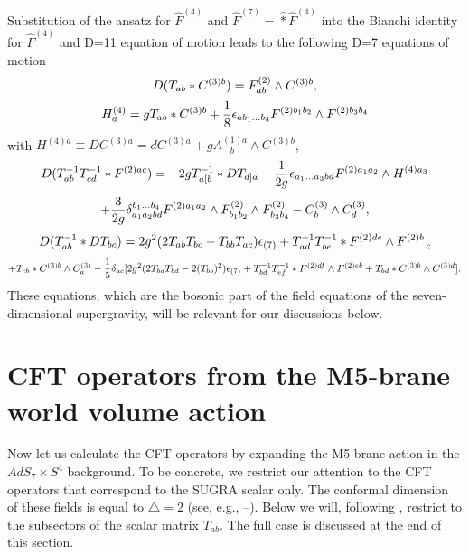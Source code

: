\documentclass[a4paper,11pt]{article}
\begin{document}
Substitution of the ansatz for ${\hat F}^{(4)}$ and ${\hat
F}^{(7)}=\hat{\ast}\hat F^{(4)}$ into the Bianchi identity for
${\hat F}^{(4)}$ and D=11 equation of motion  leads to the
following D=7 equations of motion
\begin{equation}\plabel{emC3}
D(T_{ab}\ast C^{(3)b})=F^{(2)}_{ab}\wedge C^{(3)b},
\end{equation}
\begin{equation}\plabel{emH4}
H^{(4)}_a=g T_{ab}\ast C^{(3)b}+{1\over 8}\e_{a b_1\dots b_4}F^{(2)b_1 b_2}\wedge
F^{(2)b_3 b_4}
\end{equation}
with $H^{(4)a}\equiv D C^{(3)a}=dC^{(3)a}+g A^{(1)a}_{~~~~b}\wedge C^{(3)b}$,
\begin{equation}\plabel{emF2}
D(T^{-1}_{ab}T^{-1}_{cd}\ast F^{(2)ac})=-2g T^{-1}_{a[b}\ast DT_{d]a}-{1\over 2g}
\e_{a_1\dots a_3 bd}F^{(2)a_1 a_2}\wedge H^{(4)a_3}
\end{equation}
$$
+{3\over 2g}\delta^{b_1\dots b_4}_{a_1 a_2 bd}F^{(2)a_1 a_2}\wedge
F^{(2)}_{b_1 b_2}\wedge F^{(2)}_{b_3 b_4}-C^{(3)}_b\wedge
C^{(3)}_{d},
$$
\begin{equation}\plabel{emT}
D(T^{-1}_{ab}\ast DT_{bc})=2g^2
(2T_{ab}T_{bc}-T_{bb}T_{ac})\e_{(7)} +T^{-1}_{ad}T^{-1}_{be}\ast
F^{(2)de}\wedge F^{(2)b}_{~~~~~c}
\end{equation}
$$
+T_{cb}\ast C^{(3)b}\wedge C^{(3)}_{a}-{1\over 5}\delta_{ac}[2g^2 (2T_{bd}T_{bd}-2(T_{bb})^2)
\epsilon_{(7)} +T^{-1}_{bd}T^{-1}_{ef}\ast F^{(2)df}\wedge F^{(2)eb}+T_{bd}\ast C^{(3)b}\wedge
C^{(3)d}].
$$
These equations, which are the bosonic part of the field equations
of the seven-dimensional supergravity, will be relevant for our
discussions below.



\section{CFT operators from the M5-brane world volume action}

Now let us calculate the CFT operators by expanding the M5 brane action
in the $AdS_7\times S^4$ background.
To be concrete, we restrict our attention to the CFT operators that
correspond to the SUGRA scalar only. The conformal
dimension of these fields is equal to $\triangle=2$ (see, e.g.,
\cite{minwalla}--\cite{seiberg}). Below
we will, following \cite{tran}, restrict to the subsectors of the scalar
matrix $T_{ab}$. The full case is discussed at the end of this
section.
\end{document}
